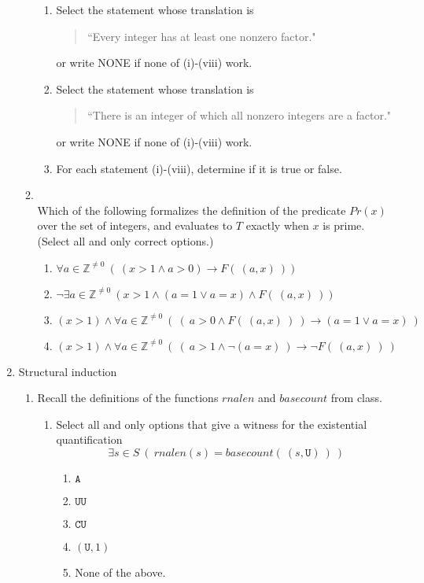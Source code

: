 \documentclass[12pt, oneside]{article}
\newcommand{\A}[0]{\texttt{A}}
\newcommand{\C}[0]{\texttt{C}}
\newcommand{\U}[0]{\texttt{U}}
\begin{document}
\begin{enumerate}
\begin{enumerate}
\begin{enumerate}
\item Select the statement whose translation is
\begin{quote}
``Every integer has at least one nonzero factor."
\end{quote}
or write NONE if none of (i)-(viii) work.

\item Select the statement whose translation is
\begin{quote}
``There is an integer of which
all nonzero integers are a factor."
\end{quote}
or write NONE if none of (i)-(viii) work.

\item For each  statement (i)-(viii), determine
if  it is true or  false.
\end{enumerate}     \item \hspace{1in}\\ 

Which of the following formalizes the definition of the predicate
$Pr(x)$ over the set of integers, and evaluates to $T$ exactly when 
$x$ is prime. (Select all and only correct options.)

\begin{enumerate}
    \item $\forall a \in \mathbb{Z}^{\neq 0}~( ~(x > 1 \land a >0) \to F(~(a,x)~))$
    \item $\lnot \exists a \in \mathbb{Z}^{\neq 0} ~(x > 1 \land (a=1 \lor a=x) \land F(~(a,x)~))$
    \item $(x > 1) \land \forall a \in \mathbb{Z}^{\neq 0}~( ~(~ a>0 \land F(~(a,x)~)~) \to (a=1 \lor a=x)~)$
    \item $(x > 1) \land \forall a \in \mathbb{Z}^{\neq 0}~( ~(~ a>1 \land \lnot (a=x) ~) \to \lnot F(~(a,x)~)~)$
\end{enumerate} \end{enumerate}
\item Structural induction
\begin{enumerate}
    \item 

Recall the definitions of the functions $rnalen$ and $basecount$ from class.

\begin{enumerate}
    \item Select all and only options that give a witness for the existential quantification
    $$\exists s \in S ~(~rnalen(s) = basecount(~(s,\U)~)~)$$
    \begin{enumerate}
    \item $\A$
    \item $\U\U$
    \item $\C\U$
    \item $(\U, 1)$
    \item None of the above.
    \end{enumerate}
    

\end{enumerate}
\end{enumerate}
\end{enumerate}
\end{document}
